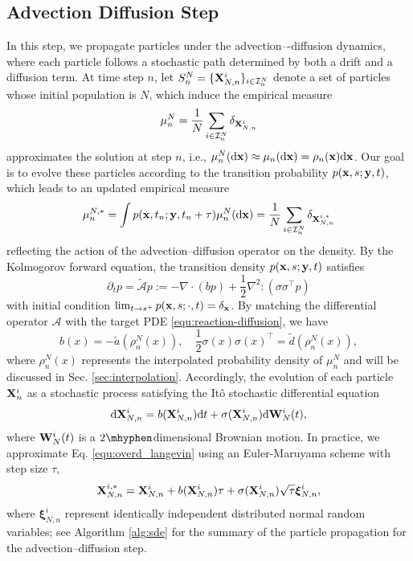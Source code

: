 \documentclass[preprint,12pt]{elsarticle}
\theoremstyle{definition}
\theoremstyle{remark}
\begin{document}
\subsection{Advection Diffusion Step}
\label{sec:adevection_diffusion}
In this step, we propagate particles under the advection–-diffusion dynamics, where each particle follows a stochastic path determined by both a drift and a diffusion term. At time step $n$, let $S^N_n = \{\mathbf{X}^i_{N,n}\}_{i\in \mathcal I_n^N}$ denote  a set of particles  whose initial population is $N$, which induce the empirical measure 
\[
\mu^N_{n}= \frac{1}{N}\sum_{i\in \mathcal I_n^N}\delta_{\mathbf{X}_{N,n}^i}
\] 
approximates the solution at step $n$, i.e.,  $\mu^N_{n} (\mathrm{d} \mathbf{x}) \approx \mu_n(\mathrm{d} \mathbf{x}) = \rho_n(\mathbf{x})\mathrm{d} \mathbf{x}$. 
Our goal is to evolve these particles according to the transition probability $p(\mathbf{x},s;\mathbf{y},t)$, which leads to an updated empirical measure
\[\mu_n^{N,*} = \int p(\mathbf{x},t_n;\mathbf{y},t_n+\tau)  \mu_n^N(\mathrm{d} \mathbf{x}) =   \frac{1}{N}\sum_{i\in \mathcal I_n^N}\delta_{\mathbf{X}_{N,n}^{i,*}}
\]  
reflecting the action of the advection--diffusion operator on the density.
By the Kolmogorov forward equation, the transition density $p(\mathbf{x},s;\mathbf{y},t)$ satisfies 
\begin{equation}
    \partial_t p = \tilde {\mathcal A }p := - \nabla \cdot(b  p) + \frac{1}{2}\nabla^2:(\sigma \sigma^\top p) 
\end{equation}
with initial condition $\lim_{t\to s^+} p(\mathbf{x},s;\cdot,t) = \delta_{\mathbf{x}}$. By matching the differential operator $\mathcal A$ with the target PDE \eqref{equ:reaction-diffusion}, we have 
\begin{equation}
    b(x) = -\tilde a(\rho^N_n(x)), \quad \frac{1}{2}\sigma(x) \sigma(x)^\top = \tilde d(\rho^N_n(x)),
\end{equation}
where $\rho^N_n(x)$ represents the interpolated probability density of $\mu_n^N$ and will be discussed in Sec. \ref{sec:interpolation}.
%
Accordingly, the evolution of each particle $\mathbf{X}^i_n$ as a stochastic process satisfying the It\^o stochastic differential equation
\begin{equation}\label{equ:overd_langevin}
    \mathrm{d} \mathbf{X}_{N,n}^i = b(\mathbf{X}_{N,n}^i) \mathrm{d} t  + \sigma(\mathbf{X}_{N,n}^i) \mathrm{d} \mathbf{W}^i_{N}(t),
\end{equation}
where $\mathbf{W}^i_{N}(t)$ is a $2\mhyphen$dimensional Brownian motion. 
In practice, we approximate Eq. \eqref{equ:overd_langevin} using an Euler-Maruyama scheme with step size $\tau$, 
\begin{equation}
 \mathbf{X}_{N,n}^{i,*} = \mathbf{X}_{N,n}^{i} + b(\mathbf{X}_{N,n}^i) \tau  + \sigma(\mathbf{X}_{N,n}^i) \sqrt{\tau} \boldsymbol{\xi}^i_{N,n},
 \label{eq:euler_maruyama}
\end{equation}
where $\boldsymbol{\xi}^i_{N,n}$ represent identically independent distributed normal random variables; see Algorithm \ref{alg:sde} for the summary of the particle propagation for the advection--diffusion step. 
\end{document}
